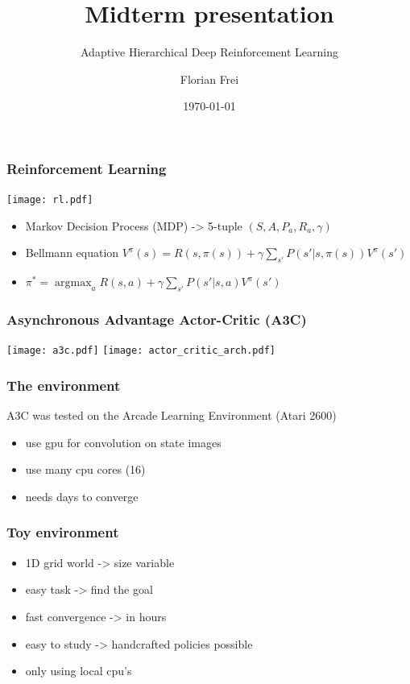 \documentclass{beamer}
\author{Florian Frei} %
\date{\today} %
\begin{document}
\title{Midterm presentation}
\subtitle{Adaptive Hierarchical Deep Reinforcement Learning}
\begin{frame}
\titlepage
\end{frame}


\begin{frame}[fragile]
\frametitle{Reinforcement Learning}
\texttt{[image: rl.pdf]}
\begin{itemize}
\item Markov Decision Process (MDP) \quad -> 5-tuple $(S, A, P_a, R_a, \gamma)$ \pause
\item Bellmann equation $V^\pi(s)= R(s,\pi(s)) + \gamma \sum_{s'} P(s'|s,\pi(s)) V^\pi(s')$ \pause
\item $\pi^{\ast} = \operatorname{argmax}_{a}{R(s,a) + \gamma \sum_{s'} P(s'|s,a) V^\pi(s')}  $
\end{itemize}
\end{frame}

\begin{frame}[fragile]
\frametitle{Asynchronous Advantage Actor-Critic \footnotemark (A3C) \cite{mnih2016asynchronous}}
\texttt{[image: a3c.pdf]}
\texttt{[image: actor\_critic\_arch.pdf]}

\end{frame}

\begin{frame}
\frametitle{The environment}
A3C was tested on the Arcade Learning Environment (Atari 2600)
\begin{itemize} \pause
\item use gpu for convolution on state images \pause
\item use many cpu cores (16) \pause
\item needs days to converge
\end{itemize}
\end{frame}

\begin{frame}
\frametitle{Toy environment}
\begin{itemize}
\item 1D grid world \pause \qquad -> size variable \pause
\item easy task \pause \qquad -> find the goal \pause
\item fast convergence \pause \qquad -> in hours \pause
\item easy to study \pause \qquad -> handcrafted policies possible \pause
\item only using local cpu's
\end{itemize}
\end{frame}
\end{document}
